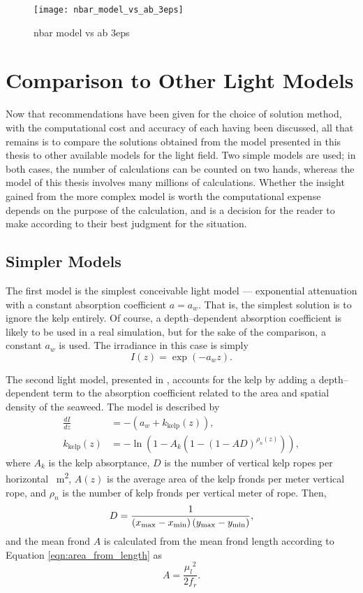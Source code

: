 \begin{figure}[H]
  \centering
  \texttt{[image: nbar\_model\_vs\_ab\_3eps]}
  \caption{nbar model vs ab 3eps}
  \label{fig:nbar_model_vs_ab_3eps}
\end{figure}


\section{Comparison to Other Light Models}

Now that recommendations have been given for the choice of solution method, with the computational cost and accuracy of each having been discussed, all that remains is to compare the solutions obtained from the model presented in this thesis to other available models for the light field.
Two simple models are used; in both cases, the number of calculations can be counted on two hands, whereas the model of this thesis involves many millions of calculations.
Whether the insight gained from the more complex model is worth the computational expense depends on the purpose of the calculation, and is a decision for the reader to make according to their best judgment for the situation.

\subsection{Simpler Models}
The first model is the simplest conceivable light model --- exponential attenuation with a constant absorption coefficient $a=a_w$.
That is, the simplest solution is to ignore the kelp entirely.
Of course, a depth--dependent absorption coefficient is likely to be used in a real simulation, but for the sake of the comparison, a constant $a_w$ is used.
The irradiance in this case is simply
\begin{equation}
  I(z) = \exp\left(-a_w z \right).
\end{equation}

The second light model, presented in \citep{broch_modelling_2012}, accounts for the kelp by adding a depth--dependent term to the absorption coefficient related to the area and spatial density of the seaweed.
The model is described by
\begin{align}
  \frac{dI}{dz} &= -\left(a_w + k_{\mbox{kelp}}(z)\right),
  \label{eqn:exp_kelp_dIdz}\\
  k_{\mbox{kelp}}(z) &= -\ln(1-A_k(1-(1-AD)^{\rho_n(z)})),
  \label{eqn:exp_kelp_k}
\end{align}
where $A_k$ is the kelp absorptance, $D$ is the number of vertical kelp ropes per horizontal \SI{}{\m\squared}, $A(z)$ is the average area of the kelp fronds per meter vertical rope, and $\rho_n$ is the number of kelp fronds per vertical meter of rope.
Then,
\begin{equation}
  D = \frac{1}{\left({x_{\max}}-{x_{\min}}\right) \left({y_{\max}}-{y_{\min}}\right)},
\end{equation}
and the mean frond $A$ is calculated from the mean frond length according to Equation \eqref{eqn:area_from_length} as
\begin{equation}
  A = \frac{{\mu_l}^2}{2f_r}.
\end{equation}

